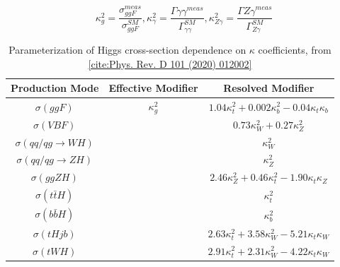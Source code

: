 \begin{equation}
\kappa_{g}^{2} = \frac{\sigma_{ggF}^{meas}}{\sigma_{ggF}^{SM}}, \kappa_{\gamma}^{2} = \frac{\Gamma{\gamma \gamma}^{meas}}{\Gamma_{\gamma \gamma}^{SM}}, \kappa_{Z \gamma}^{2} = \frac{\Gamma{Z \gamma}^{meas}}{\Gamma_{Z \gamma}^{SM}}
\end{equation}

\begin{table}[h]
    \centering
    \begin{tabular}{ccc}
	Production Mode & Effective Modifier & Resolved Modifier \\ \hline
	$\sigma(ggF)$ & $\kappa_{g}^{2}$ & $1.04 \kappa_{t}^{2} + 0.002 \kappa_{b}^2 - 0.04 \kappa_{t} \kappa_{b}$ \\
	$\sigma(VBF)$ & & $0.73 \kappa_{W}^{2} + 0.27 \kappa_{Z}^2$ \\
	$\sigma(qq/qg \rightarrow W H)$ & & $\kappa_{W}^{2}$ \\
	$\sigma(qq/qg \rightarrow ZH)$ & & $\kappa_{Z}^{2}$\\
	$\sigma(ggZH)$ && $2.46 \kappa_{Z}^{2} + 0.46 \kappa_{t}^2 - 1.90 \kappa_{t} \kappa_{Z}$ \\
	$\sigma(t\bar{t}H)$ && $\kappa_{t}^{2}$ \\
	$\sigma(b\bar{b}H)$ && $\kappa_{b}^{2}$ \\
	$\sigma(tHjb)$ && $2.63 \kappa_{t}^{2} + 3.58 \kappa_{W}^2 - 5.21 \kappa_{t} \kappa_{W}$ \\
	$\sigma(tWH)$ && $2.91 \kappa_{t}^{2} + 2.31 \kappa_{W}^2 - 4.22 \kappa_{t} \kappa_{W}$ \\
    \end{tabular}
    \caption{Parameterization of Higgs cross-section dependence on $\kappa$ coefficients, from \ref{cite:Phys. Rev. D 101 (2020) 012002}}
    \label{Xsecskappa}
\end{table}


